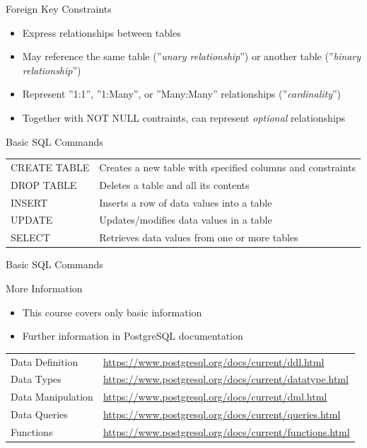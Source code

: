\documentclass[ignorenonframetext,xcolor=x11names]{beamer}
\begin{document}
\begin{frame}[label=full]{Foreign Key Constraints}
\begin{itemize}
	\item Express relationships between tables
	\item May reference the same table (''\emph{unary relationship}'') or another table (''\emph{binary relationship}'')
	\item Represent ''1:1'', ''1:Many'', or ''Many:Many'' relationships (''\emph{cardinality}'')
	\item Together with NOT NULL contraints, can represent \emph{optional} relationships
\end{itemize}
\end{frame}

\begin{frame}[label=full]{Basic SQL Commands}
\renewcommand{\arraystretch}{1.5}

\begin{tabularx}{\textwidth}{l|X} \hline
CREATE TABLE & Creates a new table with specified columns and constraints \\
DROP TABLE & Deletes a table and all its contents \\
INSERT & Inserts a row of data values into a table \\
UPDATE & Updates/modifies data values in a table \\ 
SELECT & Retrieves data values from one or more tables \\ \hline
\end{tabularx}
\end{frame}

\begin{frame}[label=withcode]{Basic SQL Commands}
\begin{block}{More Information}
  \begin{itemize}
    \item This course covers only basic information
    \item Further information in PostgreSQL documentation
  \end{itemize}
\end{block}
\vspace{3mm}
\renewcommand{\arraystretch}{1.5}
\small
\begin{tabularx}{\textwidth}{l|X} \hline
  Data Definition & \url{https://www.postgresql.org/docs/current/ddl.html} \\
  Data Types & \url{https://www.postgresql.org/docs/current/datatype.html} \\
  Data Manipulation & \url{https://www.postgresql.org/docs/current/dml.html} \\
  Data Queries & \url{https://www.postgresql.org/docs/current/queries.html} \\
  Functions & \url{https://www.postgresql.org/docs/current/functions.html} \\ \hline
\end{tabularx}
\end{frame}
\end{document}
